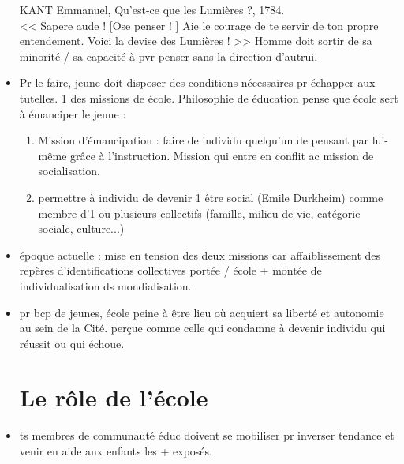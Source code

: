 \documentclass[12pt]{report}
\begin{document}
\begin{itemize}
{\begin{minipage}{18cm}
KANT Emmanuel, Qu'est-ce que les Lumières ?, 1784. \\

<< Sapere aude ! [Ose penser ! ] Aie le courage de te servir de ton propre entendement. Voici la devise des Lumières ! >> Homme doit sortir de sa minorité / sa capacité à pvr penser sans la direction d'autrui.\\
\end{minipage}
}

\vspace{0.5cm}

\item Pr le faire, jeune doit disposer des conditions nécessaires pr échapper aux tutelles. 1 des missions de école. Philosophie de éducation pense que école sert à émanciper le jeune : 
\begin{enumerate}
\item Mission d'émancipation : faire de individu quelqu'un de pensant par lui-même grâce à l'instruction. Mission qui entre en conflit ac mission de socialisation. \\
\item permettre à individu de devenir 1 être social (Emile Durkheim) comme membre d'1 ou plusieurs collectifs (famille, milieu de vie, catégorie sociale, culture...)
\end{enumerate}

\item époque actuelle : mise en tension des deux missions car affaiblissement des repères d'identifications collectives portée / école + montée de individualisation ds mondialisation.\\

\item pr bcp de jeunes, école peine à être lieu où acquiert sa liberté et autonomie au sein de la Cité. perçue comme celle qui condamne à devenir individu qui réussit ou qui échoue. \\

\section{Le rôle de l'école}


\item ts membres de communauté éduc doivent se mobiliser pr inverser tendance et venir en aide aux enfants les + exposés.\\

\end{itemize}
\end{document}
